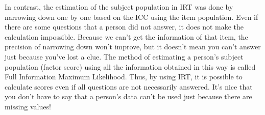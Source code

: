 \documentclass{ltjsbook}
\begin{document}
In contrast, the estimation of the subject population in IRT was done by narrowing down one by one based on the ICC using the item population. Even if there are some questions that a person did not answer, it does not make the calculation impossible. Because we can't get the information of that item, the precision of narrowing down won't improve, but it doesn't mean you can't answer just because you've lost a clue. The method of estimating a person's subject population (factor score) using all the information obtained in this way is called Full Information Maximum Likelihood. Thus, by using IRT, it is possible to calculate scores even if all questions are not necessarily answered. It's nice that you don't have to say that a person's data can't be used just because there are missing values!
\end{document}
